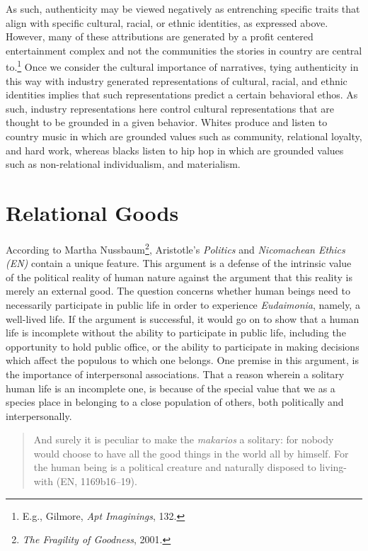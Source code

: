 \documentclass[
  12pt,
]{book}
\theoremstyle{definition}
\theoremstyle{definition}
\theoremstyle{definition}
\theoremstyle{definition}
\theoremstyle{remark}
\begin{document}
As such, authenticity may be viewed negatively as entrenching specific traits that align with specific cultural, racial, or ethnic identities, as expressed above. However, many of these attributions are generated by a profit centered entertainment complex and not the communities the stories in country are central to.\footnote{E.g., Gilmore, \emph{Apt {Imaginings}}, 132.} Once we consider the cultural importance of narratives, tying authenticity in this way with industry generated representations of cultural, racial, and ethnic identities implies that such representations predict a certain behavioral ethos. As such, industry representations here control cultural representations that are thought to be grounded in a given behavior. Whites produce and listen to country music in which are grounded values such as community, relational loyalty, and hard work, whereas blacks listen to hip hop in which are grounded values such as non-relational individualism, and materialism.

\section{Relational Goods}\label{relational-goods}

According to Martha Nussbaum\footnote{\emph{The {Fragility} of {Goodness}}, 2001.}, Aristotle's \emph{Politics} and \emph{Nicomachean Ethics (EN)} contain a unique feature. This argument is a defense of the intrinsic value of the political reality of human nature against the argument that this reality is merely an external good. The question concerns whether human beings need to necessarily participate in public life in order to experience \emph{Eudaimonia}, namely, a well-lived life. If the argument is successful, it would go on to show that a human life is incomplete without the ability to participate in public life, including the opportunity to hold public office, or the ability to participate in making decisions which affect the populous to which one belongs. One premise in this argument, is the importance of interpersonal associations. That a reason wherein a solitary human life is an incomplete one, is because of the special value that we as a species place in belonging to a close population of others, both politically and interpersonally.

\begin{quote}
And surely it is peculiar to make the \emph{makarios} a solitary: for nobody would choose to have all the good things in the world all by himself. For the human being is a political creature and naturally disposed to living-with (EN, 1169b16--19).
\end{quote}
\end{document}
